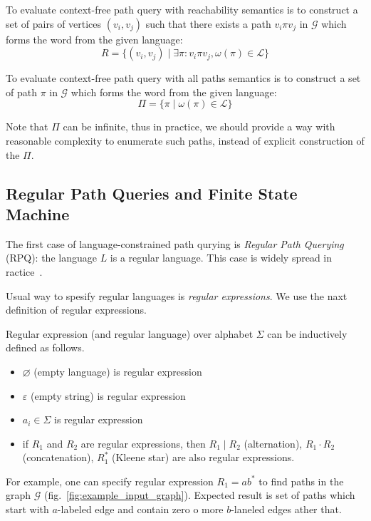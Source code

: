 \begin{definition}
To evaluate context-free path query with reachability semantics is to construct a set of pairs of vertices $(v_i,v_j)$ such that there exists a path $v_i \pi v_j$ in $\mathcal{G}$ which forms the word from the given language:
$$
R = \{(v_i,v_j) \mid \exists \pi: v_i \pi v_j, \omega(\pi) \in \mathcal{L} \}
$$
\end{definition}

\begin{definition}
To evaluate context-free path query with all paths semantics is to construct a set of path $\pi$ in $\mathcal{G}$ which forms the word from the given language:
$$
\Pi = \{ \pi \mid \omega(\pi) \in \mathcal{L}\}
$$
\end{definition}

Note that $\Pi$ can be infinite, thus in practice, we should provide a way with reasonable complexity to enumerate such paths, instead of explicit construction of the $\Pi$.

\subsection{Regular Path Queries and Finite State Machine}

The first case of language-constrained path qurying is \textit{Regular Path Querying} (RPQ): the language $L$ is a regular language. This case is widely spread in ractice~\cite{!!!}. 

Usual way to spesify regular languages is \textit{regular expressions}. 
We use the naxt definition of regular expressions.
\begin{definition}
Regular expression (and regular language) over alphabet $\Sigma$ can be inductively defined as follows.
\begin{itemize}
	\item $\varnothing$ (empty language) is regular expression
	\item $\varepsilon$ (empty string) is regular expression
	\item $a_i \in \Sigma$ is regular expression
	\item if $R_1$ and $R_2$ are regular expressions, then $R_1 \mid R_2$ (alternation), $R_1 \cdot R_2$ (concatenation), $R_1^*$ (Kleene star) are also regular expressions. 
\end{itemize}
\end{definition} 

For example, one can specify regular expression $R_1 = ab^*$ to find paths in the graph $\mathcal{G}$ (fig.~\ref{fig:example_input_graph}). Expected result is set of paths which start with $a$-labeled edge and contain zero o more $b$-laneled edges ather that.

